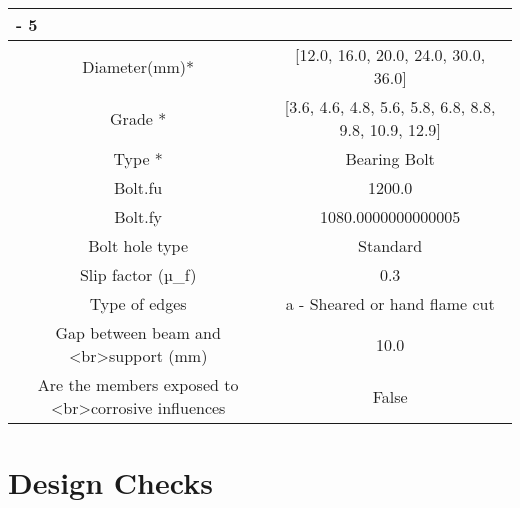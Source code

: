 \documentclass{article}%
\begin{document}
\begin{longtable}{|p{5cm}|p{2cm}|p{2cm}|p{2cm}|p{5cm}|}
{-%
5}%
\hline%
\multicolumn{5}{|c|}{\textbf{Bolt Details}}\\%
\hline%
\hline%
\multicolumn{3}{|c|}{Diameter(mm)*}&\multicolumn{2}{|c|}{{[}12.0, 16.0, 20.0, 24.0, 30.0, 36.0{]}}\\%
\hline%
\hline%
\multicolumn{3}{|c|}{Grade *}&\multicolumn{2}{|c|}{{[}3.6, 4.6, 4.8, 5.6, 5.8, 6.8, 8.8, 9.8, 10.9, 12.9{]}}\\%
\hline%
\hline%
\multicolumn{3}{|c|}{Type *}&\multicolumn{2}{|c|}{Bearing Bolt}\\%
\hline%
\hline%
\multicolumn{3}{|c|}{Bolt.fu}&\multicolumn{2}{|c|}{1200.0}\\%
\hline%
\hline%
\multicolumn{3}{|c|}{Bolt.fy}&\multicolumn{2}{|c|}{1080.0000000000005}\\%
\hline%
\hline%
\multicolumn{3}{|c|}{Bolt hole type}&\multicolumn{2}{|c|}{Standard}\\%
\hline%
\hline%
\multicolumn{3}{|c|}{Slip factor (µ\_f)}&\multicolumn{2}{|c|}{0.3}\\%
\hline%
\hline%
\multicolumn{3}{|c|}{Type of edges}&\multicolumn{2}{|c|}{a {-} Sheared or hand flame cut}\\%
\hline%
\hline%
\multicolumn{3}{|c|}{Gap between beam and <br>support (mm)}&\multicolumn{2}{|c|}{10.0}\\%
\hline%
\hline%
\multicolumn{3}{|c|}{Are the members exposed to <br>corrosive influences}&\multicolumn{2}{|c|}{False}\\%
\hline%
\end{longtable}

%
%
\section{Design Checks}%
\label{sec:DesignChecks}%
\end{document}
